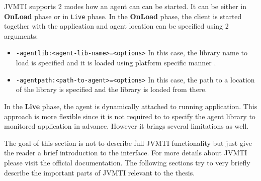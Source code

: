JVMTI supports 2 modes how an agent can can be started.  It can be either in \textbf{OnLoad} phase or in \texttt{Live} phase. In the \textbf{OnLoad} phase, the client is started together with the application and agent location can be specified using 2 arguments:
\begin{itemize}
	\item \texttt{-agentlib:<agent-lib-name>=<options>} \newline
	In this case, the library name to load is specified and it is loaded using platform specific manner .
	\item \texttt{-agentpath:<path-to-agent>=<options>} \newline
	In this case, the path to a location of the library is specified and the library is loaded from there.
\end{itemize}

In the \textbf{Live} phase, the agent is dynamically attached to running application. This approach is more flexible since it is not required to to specify the agent library to monitored application in advance. However it brings several limitations as well.

The goal of this section is not to describe full JVMTI functionality but just give the reader a brief introduction to the interface. For more details about JVMTI please visit the official documentation. The following sections try to very briefly describe the important parts of JVMTI relevant to the thesis.

